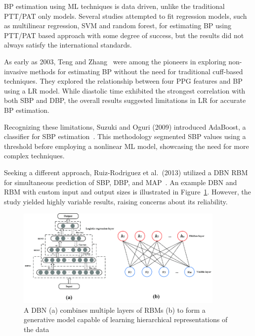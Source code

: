 BP estimation using ML techniques is data driven, unlike the traditional PTT/PAT only models.
Several studies attempted to fit regression models, such as multilinear regression, \ac{SVM} and random forest, for estimating BP using PTT/PAT based approach with some degree of success, but the results did not always satisfy the international standards.

As early as 2003, Teng and Zhang~\cite{tengContinuousNoninvasiveEstimation2003} were among the pioneers in exploring non-invasive methods for estimating BP without the need for traditional cuff-based techniques.
They explored the relationship between four PPG features and BP using a \ac{LR} model.
While diastolic time exhibited the strongest correlation with both SBP and DBP, the overall results suggested limitations in LR for accurate BP estimation.

Recognizing these limitations, Suzuki and Oguri (2009) introduced AdaBoost, a classifier for SBP estimation~\cite{suzukiCufflessBloodPressure2009}.
This methodology segmented SBP values using a threshold before employing a nonlinear ML model, showcasing the need for more complex techniques.

Seeking a different approach, Ruiz-Rodriguez et al.\ (2013) utilized a \ac{DBN} \ac{RBM} for simultaneous prediction of SBP, DBP, and MAP~\cite{ruiz-rodriguezInnovativeContinuousNoninvasive2013}.
An example DBN and RBM with custom input and output sizes is illustrated in Figure~\ref{fig:rbm}.
However, the study yielded highly variable results, raising concerns about its reliability.

\begin{figure}[h]
    \centering
    \includegraphics[width=0.9\textwidth]{images/ml/RBM}
    \captionsetup{format=plain, justification=raggedright}
    \caption{\small A DBN (a) combines multiple layers of RBMs (b) to form a generative model capable of learning hierarchical representations of the data~\cite{ouIntegratingCellularAutomata2019}}
    \label{fig:rbm}
\end{figure}

